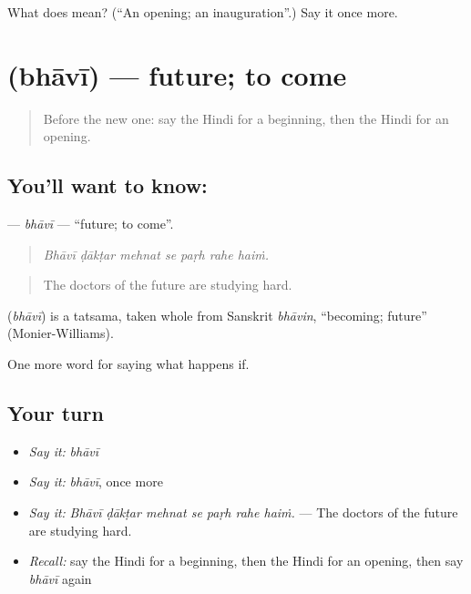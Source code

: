 \begin{tcolorbox}[breakable,colback=teal!4,colframe=teal!35!black,title={Before you move on}]
What does  mean? (\textquotedblleft{}An opening; an inauguration\textquotedblright{}.) Say it once more.
\end{tcolorbox}
\section[\texorpdfstring{\hi{भावी} (bhāvī)}{भावी (bhāvī)}]{ (bhāvī) — future; to come}

\label{lesson:HI-C559-bhavi}



\begin{quote}
Before the new one: say the Hindi for a beginning, then the Hindi for an opening.
\end{quote}

\subsection*{You'll want to know: }
\textbf{} — \emph{bhāvī} — \textquotedblleft{}future; to come\textquotedblright{}.

\begin{quote}
      
\end{quote}

\begin{quote}
\emph{Bhāvī ḍākṭar mehnat se paṛh rahe haiṁ.}
\end{quote}

\begin{quote}
The doctors of the future are studying hard.
\end{quote}

\begin{cousinweb}
\textbf{} (\emph{bhāvī}) is a tatsama, taken whole from Sanskrit \emph{bhāvin}, \textquotedblleft{}becoming; future\textquotedblright{} (Monier-Williams).
\end{cousinweb}

\begin{grammarlens}[title={What you've built}]
One more word for saying what happens if.
\end{grammarlens}

\subsection*{Your turn}
\begin{itemize}
\raggedright
  \item \emph{Say it:} \emph{bhāvī}
  \item \emph{Say it:} \emph{bhāvī}, once more
  \item \emph{Say it:} \emph{Bhāvī ḍākṭar mehnat se paṛh rahe haiṁ.} — The doctors of the future are studying hard.
  \item \emph{Recall:} say the Hindi for a beginning, then the Hindi for an opening, then say \emph{bhāvī} again
\end{itemize}

